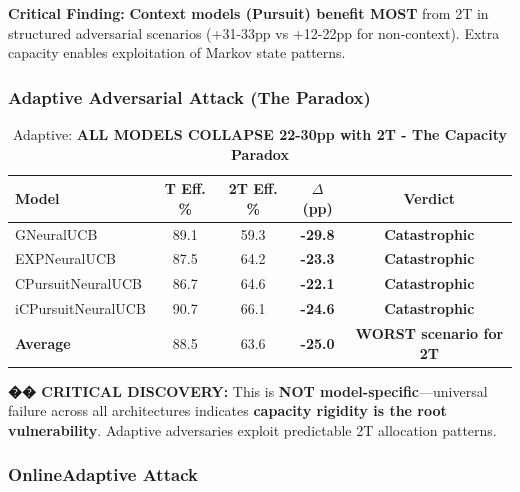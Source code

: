\documentclass[11pt,a4paper]{article}
\newcommand{\critical}[1]{\textcolor{criticalcolor}{\textbf{#1}}}
\newcommand{\success}[1]{\textcolor{successcolor}{\textbf{#1}}}
\begin{document}
\vspace{-0.2cm}
\textbf{Critical Finding:} \success{Context models (Pursuit) benefit MOST} from 2T in structured adversarial scenarios (+31-33pp vs +12-22pp for non-context). Extra capacity enables exploitation of Markov state patterns.

\subsubsection{Adaptive Adversarial Attack (The Paradox)}

\vspace{-0.4cm}
\begin{table}[H]
\scriptsize
\centering
\begin{tabular}{lcccc}
\toprule
\textbf{Model} & \textbf{T Eff. \%} & \textbf{2T Eff. \%} & \textbf{$\Delta$ (pp)} & \textbf{Verdict} \\
\midrule
GNeuralUCB & 89.1 & 59.3 & \critical{-29.8} & \critical{Catastrophic} \\
EXPNeuralUCB & 87.5 & 64.2 & \critical{-23.3} & \critical{Catastrophic} \\
CPursuitNeuralUCB & 86.7 & 64.6 & \critical{-22.1} & \critical{Catastrophic} \\
iCPursuitNeuralUCB & 90.7 & 66.1 & \critical{-24.6} & \critical{Catastrophic} \\
\midrule
\textbf{Average} & 88.5 & 63.6 & \critical{-25.0} & \critical{WORST scenario for 2T} \\
\bottomrule
\end{tabular}
\vspace{-0.2cm}
\caption{Adaptive: \critical{ALL MODELS COLLAPSE 22-30pp with 2T - The Capacity Paradox}}
\end{table}

\vspace{-0.2cm}
\textbf{�� CRITICAL DISCOVERY:} This is \critical{NOT model-specific}—universal failure across all architectures indicates \textbf{capacity rigidity is the root vulnerability}. Adaptive adversaries exploit predictable 2T allocation patterns.

\subsubsection{OnlineAdaptive Attack}
\end{document}
